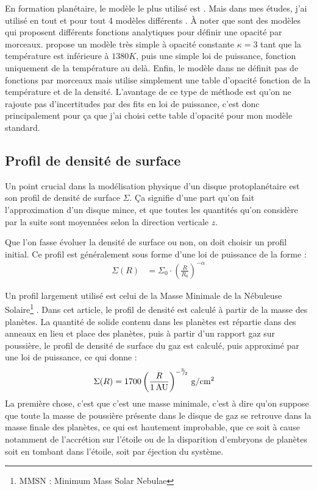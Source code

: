 En formation planétaire, le modèle le plus utilisé est \citep{bell1994FU}. Mais dans mes études, j'ai utilisé en tout et pour tout 4 modèles différents \citep{bell1994FU, zhu2009nonsteady, chambers2009analytic, hure2000transition}. À noter que \citep{bell1994FU, zhu2009nonsteady} sont des modèles qui proposent différents fonctions analytiques pour définir une opacité par morceaux. \citep{chambers2009analytic} propose un modèle très simple à opacité constante $\kappa=3$ tant que la température est inférieure à $1380\unit{K}$, puis une simple loi de puissance, fonction uniquement de la température au delà. Enfin, le modèle dans \citep{hure2000transition} ne définit pas de fonctions par morceaux mais utilise simplement une table d'opacité fonction de la température et de la densité. L'avantage de ce type de méthode est qu'on ne rajoute pas d'incertitudes par des fits en loi de puissance, c'est donc principalement pour ça que j'ai choisi cette table d'opacité pour mon modèle standard. 

\subsection{Profil de densité de surface}
Un point crucial dans la modélisation physique d'un disque protoplanétaire est son profil de densité de surface $\Sigma$. Ça signifie d'une part qu'on fait l'approximation d'un disque mince, et que toutes les quantités qu'on considère par la suite sont moyennées selon la direction verticale $z$.

Que l'on fasse évoluer la densité de surface ou non, on doit choisir un profil initial. Ce profil est généralement sous forme d'une loi de puissance de la forme : 
\begin{align}
\Sigma(R) &= \Sigma_0 \cdot \left(\frac{R}{R_0}\right)^{-\alpha}
\end{align}

Un profil largement utilisé est celui de la Masse Minimale de la Nébuleuse Solaire\footnote{MMSN : Minimum Mass Solar Nebulae} \citep{hayashi1981structure}. Dans cet article, le profil de densité est calculé à partir de la masse des planètes. La quantité de solide contenu dans les planètes est répartie dans des anneaux en lieu et place des planètes, puis à partir d'un rapport gaz sur poussière, le profil de densité de surface du gaz est calculé, puis approximé par une loi de puissance, ce qui donne : 
\begin{align}
\Sigma(R) &= 1700 \left(\frac{R}{1\mathrm{\thinspace AU}}\right)^{-{{}^{3\!\!}/ _{\!2}}} \mathrm{\thinspace g/cm^2}
\end{align}
La première chose, c'est que c'est une masse minimale, c'est à dire qu'on suppose que toute la masse de poussière présente dans le disque de gaz se retrouve dans la masse finale des planètes, ce qui est hautement improbable, que ce soit à cause notamment de l'accrétion sur l'étoile ou de la disparition d'embryons de planètes soit en tombant dans l'étoile, soit par éjection du système.


